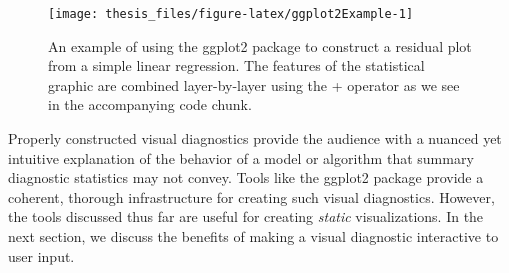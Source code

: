 \documentclass[11pt,]{isuthesis}
\newenvironment{Shaded}{\begin{snugshade}}{\end{snugshade}}
\newcommand{\AttributeTok}[1]{\textcolor[rgb]{0.77,0.63,0.00}{#1}}
\newcommand{\DecValTok}[1]{\textcolor[rgb]{0.00,0.00,0.81}{#1}}
\newcommand{\FunctionTok}[1]{\textcolor[rgb]{0.00,0.00,0.00}{#1}}
\newcommand{\NormalTok}[1]{#1}
\newcommand{\OtherTok}[1]{\textcolor[rgb]{0.56,0.35,0.01}{#1}}
\newcommand{\SpecialCharTok}[1]{\textcolor[rgb]{0.00,0.00,0.00}{#1}}
\newcommand{\StringTok}[1]{\textcolor[rgb]{0.31,0.60,0.02}{#1}}
\begin{document}
\begin{Shaded}
\end{Shaded}

\begin{figure}[!htbp]

{\centering \texttt{[image: thesis\_files/figure-latex/ggplot2Example-1]} 

}

\caption{An example of using the ggplot2 package to construct a residual plot from a simple linear regression. The features of the statistical graphic are combined layer-by-layer using the + operator as we see in the accompanying code chunk.}\label{fig:ggplot2Example}
\end{figure}

Properly constructed visual diagnostics provide the audience with a nuanced yet intuitive explanation of the behavior of a model or algorithm that summary diagnostic statistics may not convey.
Tools like the ggplot2 package provide a coherent, thorough infrastructure for creating such visual diagnostics.
However, the tools discussed thus far are useful for creating \emph{static} visualizations.
In the next section, we discuss the benefits of making a visual diagnostic interactive to user input.
\end{document}
